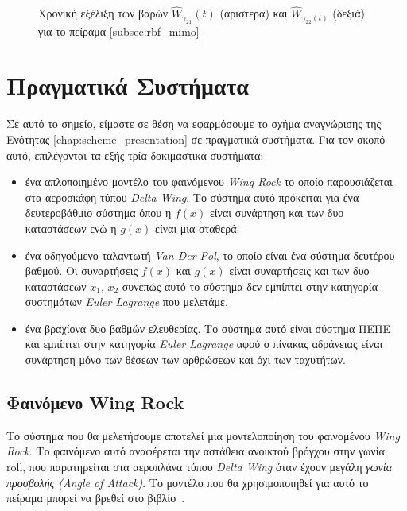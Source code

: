 \begin{figure}
	\begin{subfigure}{0.5\textwidth}
		
	\end{subfigure}
	\begin{subfigure}{0.5\textwidth}
		
	\end{subfigure}
	\caption{ Χρονική εξέλιξη των βαρών $\hat{W}_{\gamma_{21}}(t)$ (αριστερά) και $\hat{W}_{\gamma_{22}(t)}$ (δεξιά) για το πείραμα \ref{subsec:rbf_mimo}}
	\label{fig:mimo_gamma2_weights}
\end{figure}


\section{Πραγματικά Συστήματα}
\label{sec:real_system_experiments}
Σε αυτό το σημείο, είμαστε σε θέση να εφαρμόσουμε το σχήμα αναγνώρισης της Ενότητας \ref{chap:scheme_presentation} σε πραγματικά συστήματα. Για τον σκοπό αυτό, επιλέγονται τα εξής τρία  δοκιμαστικά συστήματα:

\begin{itemize}
	\item ένα απλοποιημένο μοντέλο του φαινόμενου \textit{Wing Rock} το οποίο παρουσιάζεται στα αεροσκάφη τύπου \textit{Delta Wing}. Το σύστημα αυτό πρόκειται για ένα δευτεροβάθμιο σύστημα όπου η $f(x)$ είναι συνάρτηση και των δυο καταστάσεων ενώ η $g(x)$ είναι μια σταθερά.
	
	\item ένα οδηγούμενο ταλαντωτή \textit{Van Der Pol}, το οποίο είναι ένα σύστημα δευτέρου βαθμού. Οι συναρτήσεις $f(x)$ και $g(x)$ είναι συναρτήσεις και των δυο καταστάσεων $x_1$, $x_2$ συνεπώς αυτό το σύστημα δεν εμπίπτει στην κατηγορία συστημάτων \textit{Euler Lagrange} που μελετάμε.
	
	\item ένα βραχίονα δυο βαθμών ελευθερίας. Το σύστημα αυτό είναι σύστημα ΠΕΠΕ και εμπίπτει στην κατηγορία \textit{Euler Lagrange} αφού ο πίνακας αδράνειας είναι συνάρτηση μόνο των θέσεων των αρθρώσεων και όχι των ταχυτήτων.
\end{itemize}


\subsection{Φαινόμενο Wing Rock}
\label{exp:wing_rock}
Το σύστημα που θα μελετήσουμε αποτελεί μια μοντελοποίηση του φαινομένου \textit{Wing Rock}. Το φαινόμενο αυτό αναφέρεται την αστάθεια ανοικτού βρόγχου στην γωνία roll, που παρατηρείται στα αεροπλάνα τύπου \textit{Delta Wing} όταν έχουν μεγάλη \textit{γωνία προσβολής (Angle of Attack)}. Το μοντέλο που θα χρησιμοποιηθεί για αυτό το πείραμα μπορεί να βρεθεί στο βιβλίο~\cite{eugene2013robust}.


